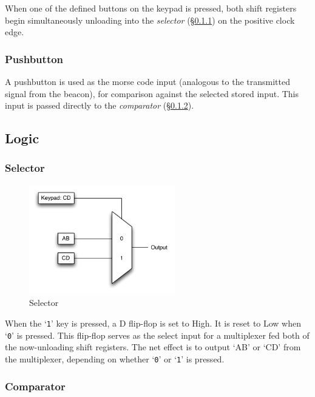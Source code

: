 \documentclass[11pt,letterpaper,titlepage]{article}
\begin{document}
When one of the defined buttons on the keypad is pressed, both shift registers begin simultaneously unloading into the \textit{selector} (\S\ref{ssS:selector}) on the positive clock edge. 
\subsubsection{Pushbutton}\label{ssS:pushbutton}
A pushbutton is used as the morse code input (analogous to the transmitted signal from the beacon), for comparison against the selected stored input. This input is passed directly to the \textit{comparator} (\S\ref{ssS:comparator}).

\subsection{Logic}
\subsubsection{Selector}\label{ssS:selector}


\begin{figure}[!htb]
	\begin{center}
		\includegraphics[width=2.5in]{graphics/selector.pdf}
		\caption{Selector}
		\label{fig:Selector}
	\end{center}
\end{figure}


When the `\texttt{1}' key is pressed, a D flip-flop is set to High. It is reset to Low when `\texttt{0}' is pressed. This flip-flop serves as the select input for a multiplexer fed both of the now-unloading shift registers. The net effect is to output `AB' or `CD' from the multiplexer, depending on whether `\texttt{0}' or `\texttt{1}' is pressed.



\subsubsection{Comparator}\label{ssS:comparator}
\end{document}
